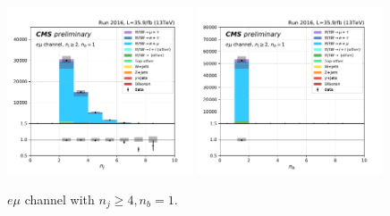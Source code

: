 \begin{figure}[ht]
    \includegraphics[width=0.49\textwidth]{chapters/Appendix/sectionPlots/figures/kinematics_pickles/emu2/1b/emu2_1b_nJets.pdf}
    \includegraphics[width=0.49\textwidth]{chapters/Appendix/sectionPlots/figures/kinematics_pickles/emu2/1b/emu2_1b_nBJets.pdf}
    
    \caption{$e\mu$ channel with $n_j\geq4, n_b=1$.}
\end{figure}

